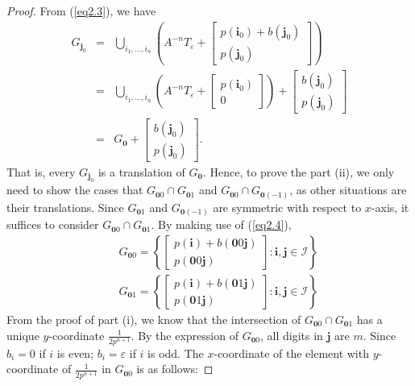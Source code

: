 \documentclass[12pt, reqno]{amsart}
\numberwithin{equation}{section}
\begin{document}
\begin{proof}
From (\ref{eq2.3}), we have
\begin{eqnarray}\label{equ.translation}
G_{{\mathbf j}_0} &=& \bigcup_{i_1,\dots,i_n}\left(A^{-n}T_\varepsilon+\left[\begin{array}{c}
p({\mathbf i_0})+b({\mathbf j}_0)\\
p({\mathbf j}_0)
\end{array}\right]\right) \nonumber \\
&=&\bigcup_{i_1,\dots,i_n}\left(A^{-n}T_\varepsilon+\left[\begin{array}{c}
p({\mathbf i_0})\\
0
\end{array}\right]\right)+\left[\begin{array}{c}
b({\mathbf j}_0)\\
p({\mathbf j}_0)
\end{array}\right] \nonumber \\
&=& G_{\mathbf 0}+\left[\begin{array}{c}
b({\mathbf j}_0)\\
p({\mathbf j}_0)
\end{array}\right].
\end{eqnarray}
That is, every $G_{{\mathbf j}_0}$ is a translation of $G_{{\mathbf 0}}$. Hence, to prove the part (ii), we only need to show the cases that $G_{{\mathbf 0}0}\cap G_{{\mathbf 0}1}$ and $G_{{\mathbf 0}0}\cap G_{{\mathbf 0}(-1)}$, as other situations are  their translations. Since  $G_{{\mathbf 0}1}$ and  $G_{{\mathbf 0}(-1)}$ are symmetric with respect to $x$-axis,    it suffices to consider $G_{{\mathbf 0}0}\cap G_{{\mathbf 0}1}$. By making use of (\ref{eq2.4}),
\begin{eqnarray*}
&& G_{{\mathbf 0}0}=\left\{ \left[\begin{array}{c}
p({\mathbf i})+b({\mathbf 0}0{\mathbf j})\\
p({\mathbf 0}0{\mathbf j})
\end{array}\right]: {\mathbf i},{\mathbf j}\in {\mathcal I} \right\} \\
&& G_{{\mathbf 0}1}=\left\{ \left[\begin{array}{c}
p({\mathbf i})+b({\mathbf 0}1{\mathbf j})\\
p({\mathbf 0}1{\mathbf j})
\end{array}\right]: {\mathbf i},{\mathbf j}\in {\mathcal I} \right\}
\end{eqnarray*}
From the proof of part (i), we know that the intersection of  $G_{{\mathbf 0}0}\cap G_{{\mathbf 0}1}$ has a unique $y$-coordinate $\frac{1}{2p^{n+1}}$. By the expression of $G_{{\mathbf 0}0}$, all digits in ${\mathbf j}$ are $m$. Since $b_i=0$ if $i$ is even; $b_i=\varepsilon$ if $i$ is odd. The $x$-coordinate of the element with $y$-coordinate of $\frac{1}{2p^{n+1}}$ in $G_{{\mathbf 0}0}$ is as follows:


\end{proof}
\end{document}
